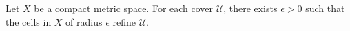 Let $X$ be a compact metric space. For each cover $\mathcal{U}$, there exists $\epsilon > 0$ such that the cells in $X$ of radius $\epsilon$ refine $\mathcal{U}$.
